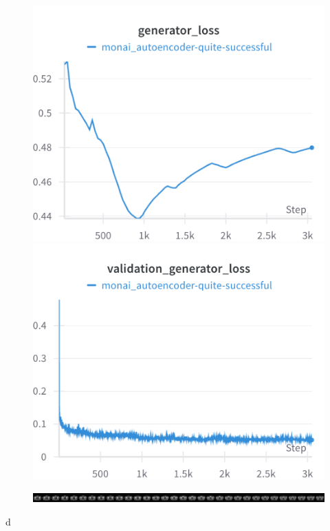 \begin{figure}[H]
\includegraphics[width=\linewidth]{detailed_engineering/Monai Autoencoder/charts/generator_loss.png}
\caption{}
\endminipage\hfill
{}
\includegraphics[width=\linewidth]{detailed_engineering/Monai Autoencoder/charts/val_generator_loss.png}
\caption{}
\endminipage
\end{figure}


\begin{figure}[H]
\includegraphics[width=\linewidth]{detailed_engineering/Monai Autoencoder/charts/reconstruction.png}
\caption{}
\end{figure}
d

